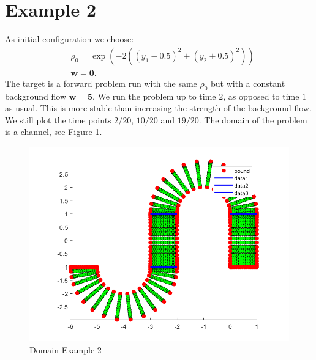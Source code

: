 \documentclass[11pt, a4paper]{article}
\theoremstyle{definition}
\newcommand{\w}{\mathbf{w}}
\begin{document}
\section{Example 2}
As initial configuration we choose:
\begin{align*}
&\rho_0 = \exp(-2((y_1 - 0.5 )^2 + (y_2 + 0.5)^2))\\
&\w = \mathbf{0}.
\end{align*}	
The target is a forward problem run with the same $\rho_0$ but with a constant background flow $\w = \mathbf{5}$. We run the problem up to time $2$, as opposed to time $1$ as usual. This is more stable than increasing the strength of the background flow. We still plot the time points $2/20$, $10/20$ and $19/20$. The domain of the problem is a channel, see Figure \ref{Dom2}.
\begin{figure}[h]
	\centering
	\includegraphics[scale=0.6]{Dom2.png}
	\caption{Domain Example 2} 
	\label{Dom2}
\end{figure}
\end{document}
